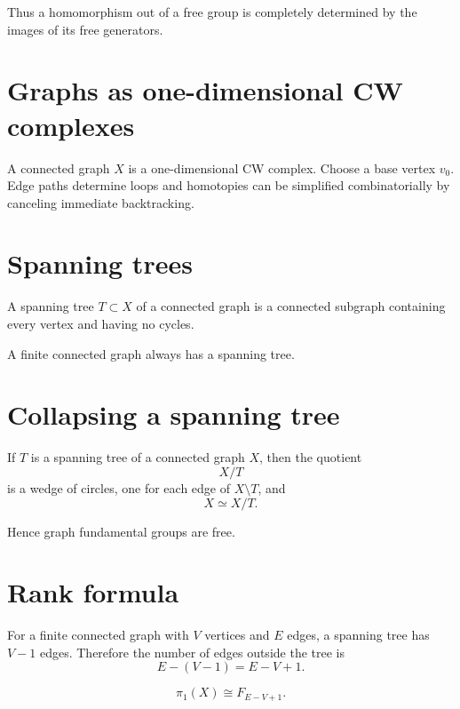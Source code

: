 Thus a homomorphism out of a free group is completely determined by the images
of its free generators.

\section{Graphs as one-dimensional CW complexes}

A connected graph \(X\) is a one-dimensional CW complex.  Choose a base vertex
\(v_0\).  Edge paths determine loops and homotopies can be simplified
combinatorially by canceling immediate backtracking.

\section{Spanning trees}

\begin{definition}
\label{def:viii14-spanning-tree}
A spanning tree \(T\subset X\) of a connected graph is a connected subgraph
containing every vertex and having no cycles.
\end{definition}

A finite connected graph always has a spanning tree.

\section{Collapsing a spanning tree}

\begin{theorem}
\label{thm:viii14-collapse-tree}
If \(T\) is a spanning tree of a connected graph \(X\), then the quotient
\[
X/T
\]
is a wedge of circles, one for each edge of \(X\setminus T\), and
\[
X\simeq X/T.
\]
\end{theorem}

Hence graph fundamental groups are free.

\section{Rank formula}

For a finite connected graph with \(V\) vertices and \(E\) edges, a spanning
tree has \(V-1\) edges.  Therefore the number of edges outside the tree is
\[
E-(V-1)=E-V+1.
\]

\begin{theorem}
\label{thm:viii14-rank}
\[
\pi_1(X)\cong F_{E-V+1}.
\]
\end{theorem}

